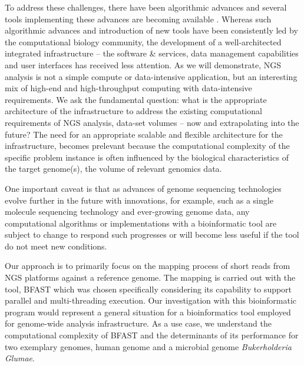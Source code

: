 \documentclass{acm_proc_article-sp}
\begin{document}

To address these challenges, there have been algorithmic advances and
several tools implementing these advances are becoming available
\cite{trapnell2009,bfast2009,scheibye-alsing2009,pepke2009,samtools}.
Whereas such algorithmic advances and introduction of new tools have
been consistently led by the computational biology community, the
development of a well-architected integrated infrastructure -- the
software \& services, data management capabilities and user interfaces
has received less attention.  As we will demonstrate, NGS analysis is
not a simple compute or data-intensive application, but an interesting
mix of high-end and high-throughput computing with data-intensive
requirements.  We ask the fundamental question: what is the
appropriate architecture of the infrastructure to address the existing
computational requirements of NGS analysis, data-set volumes -- now
and extrapolating into the future?  The need for an appropriate
scalable and flexible architecture for the infrastructure, becomes
prelevant because the computational complexity of the specific problem
instance is often influenced by the biological characteristics of the
target genome(s), the volume of relevant genomics data.

 One
important caveat is that as advances of genome sequencing technologies
evolve further in the future with innovations, for example, such as a
single molecule sequencing technology and ever-growing genome data,
any computational algorithms or implementations with a bioinformatic
tool are subject to change to respond such progresses or will become
less useful if the tool do not meet new conditions.

Our approach is to primarily focus on the mapping process of short
reads from NGS platforms against a reference genome.  The mapping is
carried out with the tool, BFAST\cite{bfast2009, bfast2009b} which was
chosen specifically considering its capability to support parallel and
multi-threading execution.  Our investigation with this bioinformatic
program would represent a general situation for a bioinformatics tool
employed for genome-wide analysis infrastructure.  As a use case, we
understand the computational complexity of BFAST\cite{bfast2009,
  bfast2009b} and the determinants of its performance for two
exemplary genomes, human genome and a microbial genome {\it
  Bukerholderia Glumae}.
 
\end{document}
